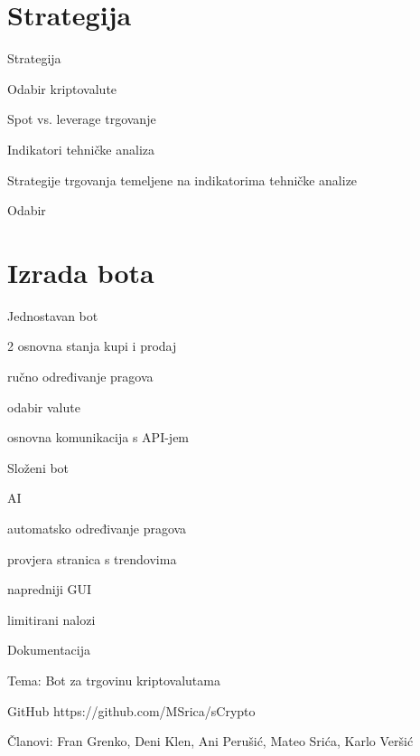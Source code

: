 \documentclass[aspectratio=169,xcolor=dvipsnames]{beamer}
\begin{document}
\section{Strategija}

\begin{frame}{Strategija}
    \item Odabir kriptovalute
    \item Spot vs. leverage trgovanje
    \item Indikatori tehničke analiza
    \item Strategije trgovanja temeljene na indikatorima tehničke analize
    \item Odabir
    
\end{frame}

\section{Izrada bota}

\begin{frame}{Jednostavan bot}
    \item 2 osnovna stanja kupi i prodaj
    \item ručno određivanje pragova
    \item odabir valute
    \item osnovna komunikacija s API-jem
\end{frame}


\begin{frame}{Složeni bot}
  \item AI
  \item automatsko određivanje pragova
  \item provjera stranica s trendovima
  \item napredniji GUI
  \item limitirani nalozi
\end{frame}


\begin{frame}{Dokumentacija}
    \item Tema: Bot za trgovinu kriptovalutama
    \item GitHub https://github.com/MSrica/sCrypto
    \item Članovi: Fran Grenko, Deni Klen, Ani Perušić, Mateo Srića, Karlo Veršić
\end{frame}
\end{document}
